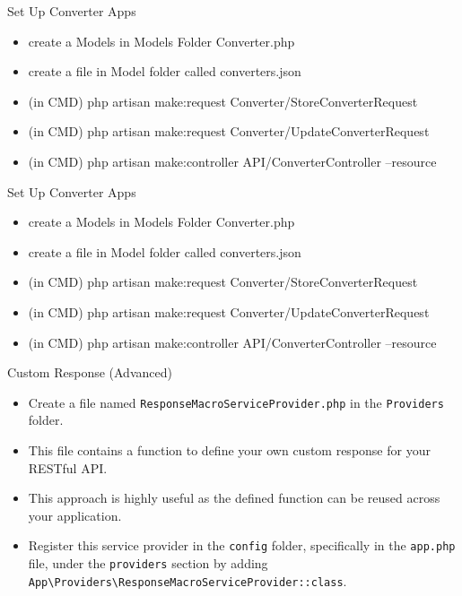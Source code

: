 \documentclass[aspectratio=169, table]{beamer}
\begin{document}
\begin{frame}[fragile]{Set Up Converter Apps}
    \begin{itemize}
        \item create a Models in Models Folder Converter.php
        \item create a file in Model folder called converters.json
        \item (in CMD) php artisan make:request Converter/StoreConverterRequest
        \item (in CMD) php artisan make:request Converter/UpdateConverterRequest
        \item (in CMD) php artisan make:controller API/ConverterController --resource
    \end{itemize}
\end{frame}

\begin{frame}[fragile]{Set Up Converter Apps}
    \begin{itemize}
        \item create a Models in Models Folder Converter.php
        \item create a file in Model folder called converters.json
        \item (in CMD) php artisan make:request Converter/StoreConverterRequest
        \item (in CMD) php artisan make:request Converter/UpdateConverterRequest
        \item (in CMD) php artisan make:controller API/ConverterController --resource
    \end{itemize}
\end{frame}

\begin{frame}[fragile]{Custom Response (Advanced)}
    \begin{itemize}
        \item Create a file named \texttt{ResponseMacroServiceProvider.php} in the \texttt{Providers} folder.
        \item This file contains a function to define your own custom response for your RESTful API.
        \item This approach is highly useful as the defined function can be reused across your application.
        \item Register this service provider in the \texttt{config} folder, specifically in the \texttt{app.php} file, under the \texttt{providers} section by adding \texttt{App\textbackslash Providers\textbackslash ResponseMacroServiceProvider::class}.
        
    \end{itemize}
\end{frame}
\end{document}
